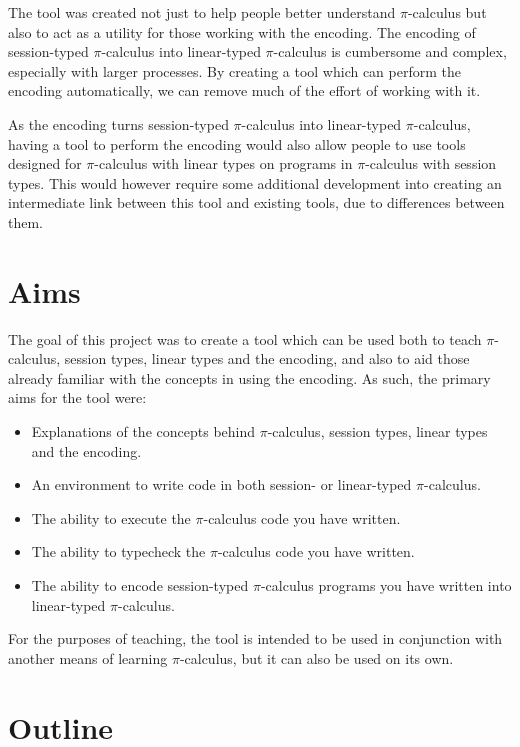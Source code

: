 \documentclass{l4proj}
\begin{document}
\quad The tool was created not just to help people better understand $\pi$-calculus but also to act as a utility for those working with the encoding. The encoding of session-typed $\pi$-calculus into linear-typed $\pi$-calculus is cumbersome and complex, especially with larger processes. By creating a tool which can perform the encoding automatically, we can remove much of the effort of working with it.

\quad As the encoding turns session-typed $\pi$-calculus into linear-typed $\pi$-calculus, having a tool to perform the encoding would also allow people to use tools designed for $\pi$-calculus with linear types on programs in $\pi$-calculus with session types. This would however require some additional development into creating an intermediate link between this tool and existing tools, due to differences between them.

\section{Aims}
\label{introAims}

\quad The goal of this project was to create a tool which can be used both to teach $\pi$-calculus, session types, linear types and the encoding, and also to aid those already familiar with the concepts in using the encoding. As such, the primary aims for the tool were:

\begin{itemize}
    \item Explanations of the concepts behind $\pi$-calculus, session types, linear types and the encoding.
    \item An environment to write code in both session- or linear-typed $\pi$-calculus.
    \item The ability to execute the $\pi$-calculus code you have written.
    \item The ability to typecheck the $\pi$-calculus code you have written.
    \item The ability to encode session-typed $\pi$-calculus programs you have written into linear-typed $\pi$-calculus.
\end{itemize}

\quad For the purposes of teaching, the tool is intended to be used in conjunction with another means of learning $\pi$-calculus, but it can also be used on its own.

\section{Outline}
\label{introOutline}
\end{document}
